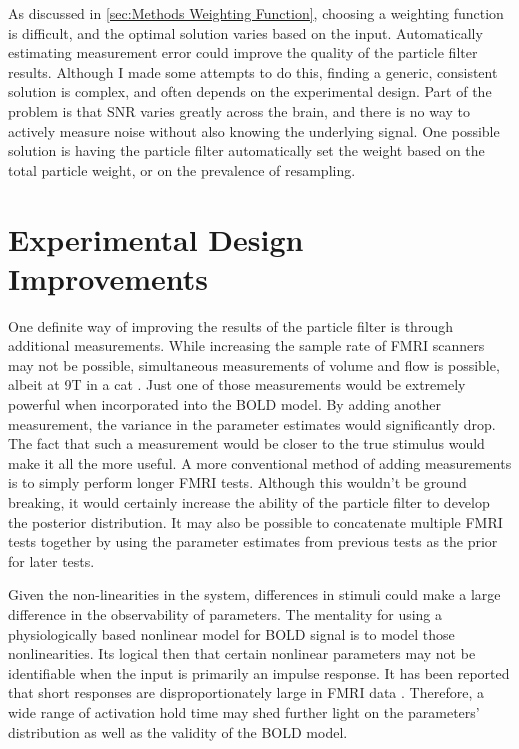 As discussed in \autoref{sec:Methods Weighting Function}, choosing a weighting
function is difficult, and the optimal solution varies based on the input.
Automatically estimating measurement error could improve
the quality of the particle filter results. Although I made some attempts to do
this, finding a generic, consistent solution is complex, and often depends on the
experimental design. Part of the problem is that SNR varies greatly across
the brain, and there is no way to actively measure noise without also knowing
the underlying signal. One possible solution is having the particle filter automatically
set the weight based on the total particle weight, or on the prevalence of resampling.

\section{Experimental Design Improvements}
\label{sec:Sideways Measurements}
One definite way of improving the results of the particle filter is through
additional measurements. While increasing the sample rate of FMRI scanners may
not be possible, simultaneous measurements of volume and flow is
possible, albeit at 9T in a cat \cite{Hu2009}. Just one of those measurements
would be extremely powerful when incorporated into the BOLD
model. By adding another measurement, the
variance in the parameter estimates would significantly drop. The fact
that such a measurement would be closer to the true stimulus would make it
all the more useful.
A more conventional method of adding measurements is to
simply perform longer FMRI tests. Although this wouldn't be
ground breaking, it would certainly increase the ability of the
particle filter to develop the posterior distribution.
It may also be possible to concatenate multiple FMRI tests together
by using the parameter estimates from previous tests as the
prior for later tests. 

Given the non-linearities in the system, differences in stimuli
could make a large difference in the observability of parameters. The mentality
for using a physiologically based nonlinear model for BOLD signal is to model
those nonlinearities. Its logical then that certain nonlinear parameters may not
be identifiable when the input is primarily an impulse response. It
has been reported that short responses are disproportionately large
in FMRI data \cite{Miller2001, Deneux2006}. Therefore,
a wide range of activation hold time may shed further light on
the parameters' distribution as well as the validity of the BOLD model.


